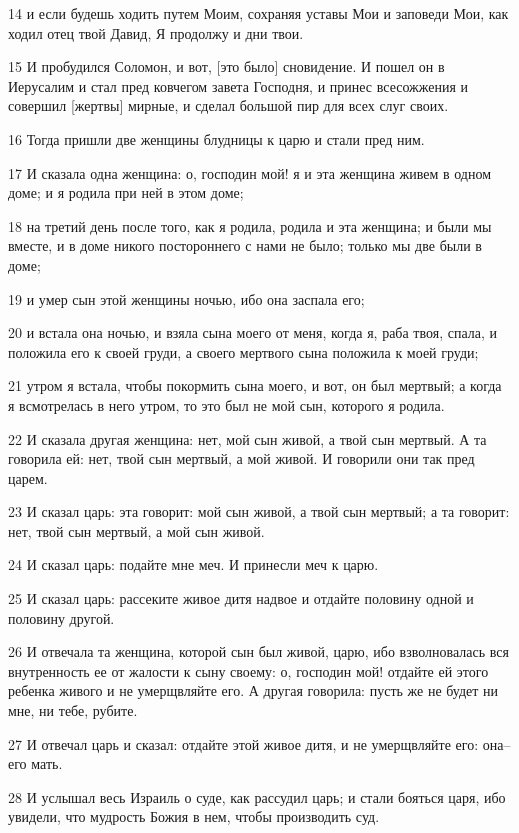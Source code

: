\par 14 и если будешь ходить путем Моим, сохраняя уставы Мои и заповеди Мои, как ходил отец твой Давид, Я продолжу и дни твои.
\par 15 И пробудился Соломон, и вот, [это было] сновидение. И пошел он в Иерусалим и стал пред ковчегом завета Господня, и принес всесожжения и совершил [жертвы] мирные, и сделал большой пир для всех слуг своих.
\par 16 Тогда пришли две женщины блудницы к царю и стали пред ним.
\par 17 И сказала одна женщина: о, господин мой! я и эта женщина живем в одном доме; и я родила при ней в этом доме;
\par 18 на третий день после того, как я родила, родила и эта женщина; и были мы вместе, и в доме никого постороннего с нами не было; только мы две были в доме;
\par 19 и умер сын этой женщины ночью, ибо она заспала его;
\par 20 и встала она ночью, и взяла сына моего от меня, когда я, раба твоя, спала, и положила его к своей груди, а своего мертвого сына положила к моей груди;
\par 21 утром я встала, чтобы покормить сына моего, и вот, он был мертвый; а когда я всмотрелась в него утром, то это был не мой сын, которого я родила.
\par 22 И сказала другая женщина: нет, мой сын живой, а твой сын мертвый. А та говорила ей: нет, твой сын мертвый, а мой живой. И говорили они так пред царем.
\par 23 И сказал царь: эта говорит: мой сын живой, а твой сын мертвый; а та говорит: нет, твой сын мертвый, а мой сын живой.
\par 24 И сказал царь: подайте мне меч. И принесли меч к царю.
\par 25 И сказал царь: рассеките живое дитя надвое и отдайте половину одной и половину другой.
\par 26 И отвечала та женщина, которой сын был живой, царю, ибо взволновалась вся внутренность ее от жалости к сыну своему: о, господин мой! отдайте ей этого ребенка живого и не умерщвляйте его. А другая говорила: пусть же не будет ни мне, ни тебе, рубите.
\par 27 И отвечал царь и сказал: отдайте этой живое дитя, и не умерщвляйте его: она--его мать.
\par 28 И услышал весь Израиль о суде, как рассудил царь; и стали бояться царя, ибо увидели, что мудрость Божия в нем, чтобы производить суд.

